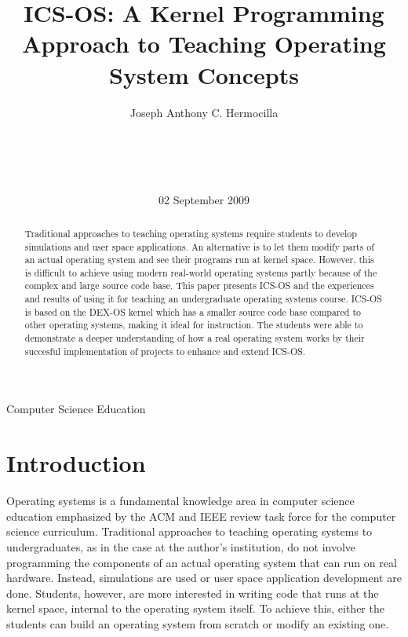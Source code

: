 \documentclass{acm_proc_article-sp}
\begin{document}
\title{ICS-OS: A Kernel Programming Approach to Teaching Operating System
Concepts}

\author{
\alignauthor
Joseph Anthony C. Hermocilla\\
       \\
       \\
       \\
       \\
}
\date{02 September 2009}

\maketitle
\begin{abstract}
Traditional approaches to teaching operating systems require students to
develop simulations and user space applications. An alternative
is to let them modify parts of an actual operating system and see their
programs run at kernel space. However, this is difficult to 
achieve using modern real-world operating systems partly because of the complex
and large source code base. This paper presents ICS-OS and the experiences and
results of using it for teaching an undergraduate operating systems course. 
ICS-OS is based on the DEX-OS kernel which has a smaller source code base
compared to other operating systems, making it ideal for instruction. 
The students were able to demonstrate a deeper understanding
of how a real operating system works by their succesful implementation of
projects to enhance and extend ICS-OS.
\end{abstract}

{Computer Science Education}


\section{Introduction}
Operating systems is a fundamental knowledge area in computer science education
emphasized by the ACM and IEEE review task force for the computer science 
curriculum. Traditional approaches to teaching operating systems to 
undergraduates, as in the case at the author's institution, do not involve 
programming the components of an actual operating system that can run on 
real hardware. Instead, simulations are used or user space application 
development are done. Students, however, are more interested in writing code
that runs at the kernel space, internal to the operating system itself.
To achieve this, either the students can build an operating system from scratch
or modify an existing one.
\end{document}
